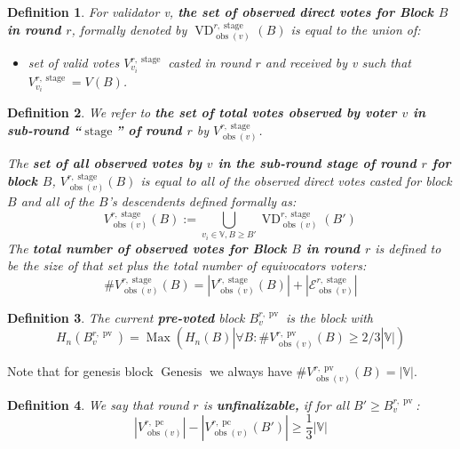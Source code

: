 \documentclass{article}
\newcommand{\assign}{:=}
\newcommand{\nosymbol}{}
\newcommand{\tmop}[1]{\ensuremath{\operatorname{#1}}}
\newcommand{\tmstrong}[1]{\textbf{#1}}
\newcommand{\tmtextbf}[1]{{\bfseries{#1}}}
\newenvironment{itemizedot}{\begin{itemize} \renewcommand{\labelitemi}{$\bullet$}\renewcommand{\labelitemii}{$\bullet$}\renewcommand{\labelitemiii}{$\bullet$}\renewcommand{\labelitemiv}{$\bullet$}}{\end{itemize}}
\newtheorem{definition}{Definition}
\providecommand{\nosymbol}{}
\providecommand{\tmop}[1]{\ensuremath{\mathrm{#1}}}
\providecommand{\tmstrong}[1]{\tmtextbf{#1}}
\providecommand{\tmtextbf}[1]{\tmtextbf{#1}}
\newtheorem{definition}{Definition}
\begin{document}
\begin{definition}
  For validator v, {\tmstrong{the set of observed direct votes for Block $B$
  in round $r$}}, formally denoted by $\tmop{VD}^{r, \tmop{stage}}_{\tmop{obs}
  (v)}^{\nosymbol}_{\nosymbol} (B)$ is equal to the union of:
  \begin{itemizedot}
    \item set of valid votes $V^{r, \tmop{stage}}_{v_i}$ casted in round $r$
    and received by v such that $V^{r, \tmop{stage}}_{v_i} = V (B)$.
  \end{itemizedot}
\end{definition}

\begin{definition}
  We refer to {\tmstrong{the set of total votes observed by voter $v$ in
  sub-round ``$\tmop{stage}$'' of round $r$}} by {\tmstrong{$V^{r,
  \tmop{stage}}_{\tmop{obs} (v)}^{\nosymbol}_{\nosymbol}$}}.
  
  The {\tmstrong{set of all observed votes by $v$ in the sub-round stage of
  round $r$ for block $B$}}, {\tmstrong{$V^{r, \tmop{stage}}_{\tmop{obs} (v)}
  (B)$}} is equal to all of the observed direct votes casted for block $B$ and
  all of the $B$'s descendents defined formally as:
  \[ V^{r, \tmop{stage}}_{\tmop{obs} (v)} (B) \assign \bigcup_{v_i \in
     \mathbb{V}, B \geqslant B'} \tmop{VD}^{r, \tmop{stage}}_{\tmop{obs} (v)}
     (B')_{\nosymbol}^{\nosymbol}_{\nosymbol} \]
  The {\tmstrong{total number of observed votes for Block $B$ in round $r$}}
  is defined to be the size of that set plus the total number of equivocators
  voters:
  \[ \#V^{r, \tmop{stage}}_{\tmop{obs} (v)} (B) = |V^{r,
     \tmop{stage}}_{\tmop{obs} (v)} (B) | + | \mathcal{E}^{r,
     \tmop{stage}}_{\tmop{obs} (v)} | \]
\end{definition}

\begin{definition}
  The current {\tmstrong{pre-voted}} block $B^{r, \tmop{pv}}_v$ is the block
  with
  \[ H_n (B^{r, \tmop{pv}}_v) = \tmop{Max} (H_n (B) | \forall B :
     \#V_{\tmop{obs} (v)}^{r, \tmop{pv}} (B) \geqslant 2 / 3|\mathbb{V}|) \]
\end{definition}

Note that for genesis block $\tmop{Genesis}$ we always have $\#V_{\tmop{obs}
(v)}^{r, \tmop{pv}} (B) = | \mathbb{V} |$.

\begin{definition}
  We say that round $r$ is {\tmstrong{unfinalizable,}} if for all $B'
  \geqslant B_v^{r, \tmop{pv}}$:
  \[ |V^{r, \tmop{pc}}_{\tmop{obs} (v)} | - |V^{r, \tmop{pc}}_{\tmop{obs}
     (v)_{\nosymbol}} (B') | \geqslant \frac{1}{3} |\mathbb{V}| \]
\end{definition}
\end{document}
